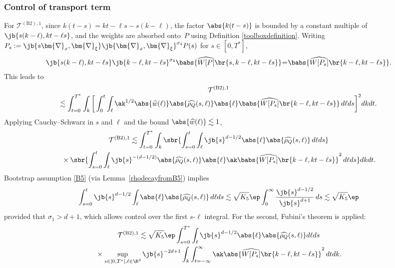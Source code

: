 \subsubsection{Control of transport term}\label{controloftransportB2original}
For $\mathcal{T}^{\mathrm{(B2),1}}$, since $k(t-s)=kt-\ell s-s(k-\ell)$, the factor $\abs{k(t-s)}$ is bounded by a constant multiple of $\jb{s(k-\ell),kt-\ell s}$, and the weights are absorbed onto~$P$ using Definition \ref{toolboxdefinition}. Writing $P_s:=\jb{s\bm{\nabla}_x,\bm{\nabla}_\xi}\jb{\bm{\nabla}_x,\bm{\nabla}_\xi}^{\sigma_4}P(s)$ for $s\in[0,T^*]$,
\begin{align*}
\jb{s(k-\ell),kt-\ell s}\jb{k-\ell,kt-\ell s}^{\sigma_4}\babs{\widehat {W[P]}\br{s,k-\ell,kt-\ell s}}\hspace{-0.08cm}=\hspace{-0.08cm}\babs{\widehat{W[P_s]}\br{k-\ell,kt-\ell s}}.
\end{align*}
This leads to
\begin{multline}\label{TforB2original}
\mathcal{T}^{\mathrm{(B2),1}}\\[-5pt]
\lesssim\int_{t=0}^{T^*}\int_k\bigg[\int_0^t\int_\ell\ak^{1/2}\abs{\widehat w(\ell)}\abs{\widehat{\rho_Q}(s,\ell)} \abs{\ell}\babs{\widehat{W[P_s]}\br{k-\ell,kt-\ell s}}\,d\ell ds\bigg]^2dkdt.
\end{multline}
Applying Cauchy--Schwarz in $s$ and $\ell$ and the bound $\abs{\widehat w(\ell)}\lesssim1$,
\begin{multline*}
\mathcal{T}^{\mathrm{(B2),1}}\lesssim\int_{t=0}^{T^*}\int_k\sbr{\int_{s=0}^t\int_\ell\jb{s}^{d-1/2}\abs{\ell}\abs{\widehat{\rho_Q}(s,\ell)}\,d\ell ds}\\
{}\times\sbr{\int_{s=0}^t\int_\ell\jb{s}^{-(d-1/2)}\abs{\widehat{\rho_Q}(s,\ell)} \abs{\ell}\ak\babs{\widehat{W[P_s]}\br{k-\ell,kt-\ell s}}^2\,d\ell ds}dkdt.
\end{multline*}
Bootstrap assumption \eqref{B5} (via Lemma~\ref{rhodecayfromB5}) implies
\begin{align*}
\int_{s=0}^t\jb{s}^{d-1/2}\int_\ell\abs{\ell}\abs{\widehat{\rho_Q}(s,\ell)}\,d\ell ds\lesssim\sqrt{K_5}\ep\int_0^\infty\frac{\jb{s}^{d-1/2}}{\jb{s}^{d+1}}\,ds\lesssim\sqrt{K_5}\ep
\end{align*}provided that $\sigma_1>d+1$, which allows control over the first $s$-$\ell$ integral. For the second, Fubini's theorem is applied:
\begin{multline*}
\mathcal{T}^{\mathrm{(B2),1}}\lesssim\sqrt{K_5}\ep\int_{s=0}^{T^*} \int_\ell \jb{s}^{d-1/2}\abs{\ell}\abs{\widehat{\rho_Q}(s,\ell)} d\ell ds\\
{}\times\sup_{s\in[0,T^*],\ell\in\R^d}\jb{s}^{-2d+1}\int_k\int_{t=-\infty}^\infty\ak\abs{\widehat{W[P_s]}\br{k-\ell,kt-\ell s}}^2\,dtdk.
\end{multline*}

